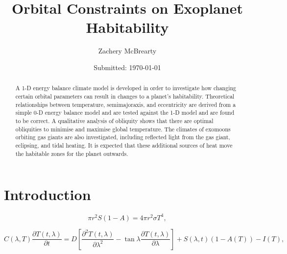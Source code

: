 \documentclass[12pt, onecolumn]{revtex4-2}    %
\newcommand{\partialderiv}[2]{\frac{\partial {#1}}{\partial {#2}}}
\newcommand{\partialderivsecnd}[2]{\frac{\partial^2 {#1}}{\partial {#2}^2}}
\begin{document}
\title{Orbital Constraints on Exoplanet Habitability}
\date{Submitted: \today{}}
\author{Zachery McBrearty}

\begin{abstract}

  A 1-D energy balance climate model is developed in order to investigate how changing certain orbital parameters can result in changes to a planet's habitability.
  Theoretical relationships between temperature, semimajoraxis, and eccentricity are derived from a simple 0-D energy balance model and are tested against the 1-D model and are found to be correct.
  A qualitative analysis of obliquity shows that there are optimal obliquities to minimise and maximise global temperature.
  The climates of exomoons orbiting gas giants are also investigated, including reflected light from the gas giant, eclipsing, and tidal heating.
  It is expected that these additional sources of heat move the habitable zones for the planet outwards.

\end{abstract}


\maketitle

\tableofcontents

\newpage

\section{Introduction} \label{sec:Introduction}


\begin{equation}
  \pi r^2 S(1-A) = 4 \pi r^2 \sigma T^4,
  \label{eq:0DEBCM}
\end{equation}

\begin{equation}
  C(\lambda, T) \partialderiv{T(t, \lambda)}{t} = D\left[\partialderivsecnd{T(t, \lambda)}{\lambda} - \tan\lambda\partialderiv{T(t, \lambda)}{\lambda}\right] + S(\lambda, t)(1-A(T)) - I(T),
  \label{eq:1DEBCM}
\end{equation}
\end{document}

